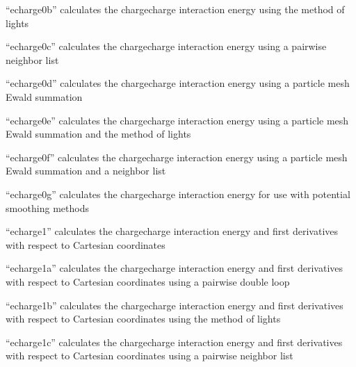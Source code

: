 \documentclass[letterpaper,11pt,english]{sphinxmanual}
\begin{document}

“echarge0b” calculates the charge\sphinxhyphen{}charge interaction energy
using the method of lights


“echarge0c” calculates the charge\sphinxhyphen{}charge interaction energy
using a pairwise neighbor list


“echarge0d” calculates the charge\sphinxhyphen{}charge interaction energy
using a particle mesh Ewald summation


“echarge0e” calculates the charge\sphinxhyphen{}charge interaction energy
using a particle mesh Ewald summation and the method of lights


“echarge0f” calculates the charge\sphinxhyphen{}charge interaction energy
using a particle mesh Ewald summation and a neighbor list


“echarge0g” calculates the charge\sphinxhyphen{}charge interaction energy
for use with potential smoothing methods


“echarge1” calculates the charge\sphinxhyphen{}charge interaction energy
and first derivatives with respect to Cartesian coordinates


“echarge1a” calculates the charge\sphinxhyphen{}charge interaction energy
and first derivatives with respect to Cartesian coordinates
using a pairwise double loop


“echarge1b” calculates the charge\sphinxhyphen{}charge interaction energy
and first derivatives with respect to Cartesian coordinates
using the method of lights


“echarge1c” calculates the charge\sphinxhyphen{}charge interaction energy
and first derivatives with respect to Cartesian coordinates
using a pairwise neighbor list

\end{document}
